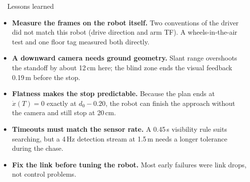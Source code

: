 \begin{keybox}{\faLightbulb\ \ Lessons learned}
\small
\begin{itemize}
  \item \textbf{Measure the frames on the robot itself.} Two conventions of the driver did not match this robot (drive
        direction and arm TF). A wheels-in-the-air test and one floor tag measured both directly.
  \item \textbf{A downward camera needs ground geometry.} Slant range overshoots the standoff by about 12\,cm here; the
        blind zone ends the visual feedback 0.19\,m before the stop.
  \item \textbf{Flatness makes the stop predictable.} Because the plan ends at $\dot x(T)=0$ exactly at $d_0-0.20$, the
        robot can finish the approach without the camera and still stop at 20\,cm.
  \item \textbf{Timeouts must match the sensor rate.} A 0.45\,s visibility rule suits searching, but a 4\,Hz detection
        stream at 1.5\,m needs a longer tolerance during the chase.
  \item \textbf{Fix the link before tuning the robot.} Most early failures were link drops, not control problems.
\end{itemize}
\end{keybox}
